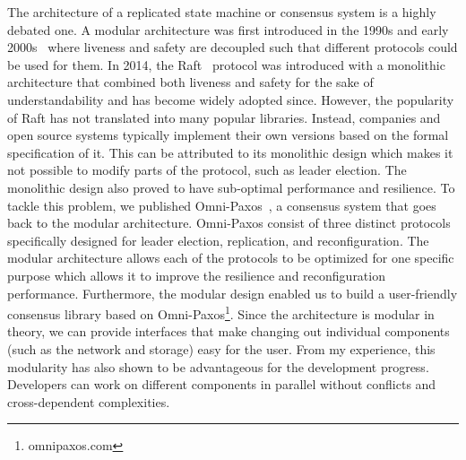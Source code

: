 \documentclass[11pt]{article}
\begin{document}
The architecture of a replicated state machine or consensus system is a highly debated one. A modular architecture was first introduced in the 1990s and early 2000s~\cite{Lamport2001PaxosMS} where liveness and safety are decoupled such that different protocols could be used for them. In 2014, the Raft~\cite{ongaro2014search} protocol was introduced with a monolithic architecture that combined both liveness and safety for the sake of understandability and has become widely adopted since. However, the popularity of Raft has not translated into many popular libraries. Instead, companies and open source systems typically implement their own versions based on the formal specification of it. This can be attributed to its monolithic design which makes it not possible to modify parts of the protocol, such as leader election. The monolithic design also proved to have sub-optimal performance and resilience. To tackle this problem, we published Omni-Paxos~\cite{ng2023omni}, a consensus system that goes back to the modular architecture. Omni-Paxos consist of three distinct protocols specifically designed for leader election, replication, and reconfiguration. The modular architecture allows each of the protocols to be optimized for one specific purpose which allows it to improve the resilience and reconfiguration performance. Furthermore, the modular design enabled us to build a user-friendly consensus library based on Omni-Paxos\footnote{omnipaxos.com}. Since the architecture is modular in theory, we can provide interfaces that make changing out individual components (such as the network and storage) easy for the user. From my experience, this modularity has also shown to be advantageous for the development progress. Developers can work on different components in parallel without conflicts and cross-dependent complexities.
\end{document}
